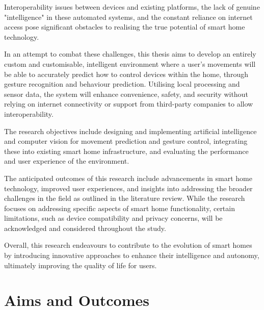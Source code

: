 Interoperability issues between devices and existing platforms, the lack of genuine "intelligence" in these automated systems, and the constant reliance on internet access pose significant obstacles to realising the true potential of smart home technology.

In an attempt to combat these challenges, this thesis aims to develop an entirely custom and customisable, intelligent environment where a user's movements will be able to accurately predict how to control devices within the home, through gesture recognition and behaviour prediction.
Utilising local processing and sensor data, the system will enhance convenience, safety, and security without relying on internet connectivity or support from third-party companies to allow interoperability.

The research objectives include designing and implementing artificial intelligence and computer vision for movement prediction and gesture control, integrating these into existing smart home infrastructure, and evaluating the performance and user experience of the environment.

The anticipated outcomes of this research include advancements in smart home technology, improved user experiences, and insights into addressing the broader challenges in the field as outlined in the literature review.
While the research focuses on addressing specific aspects of smart home functionality, certain limitations, such as device compatibility and privacy concerns, will be acknowledged and considered throughout the study.

Overall, this research endeavours to contribute to the evolution of smart homes by introducing innovative approaches to enhance their intelligence and autonomy, ultimately improving the quality of life for users.

\section{Aims and Outcomes}